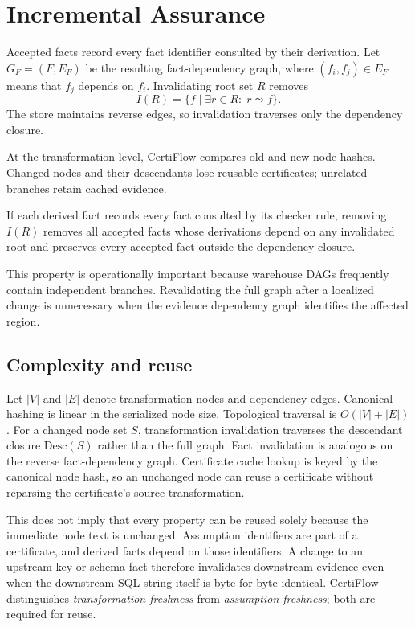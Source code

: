 \section{Incremental Assurance}

Accepted facts record every fact identifier consulted by their derivation. Let $G_F=(F,E_F)$ be the resulting fact-dependency graph, where $(f_i,f_j)\in E_F$ means that $f_j$ depends on $f_i$. Invalidating root set $R$ removes
\[
  I(R)=\{f\mid \exists r\in R:\;r\leadsto f\}.
\]
The store maintains reverse edges, so invalidation traverses only the dependency closure.

At the transformation level, CertiFlow compares old and new node hashes. Changed nodes and their descendants lose reusable certificates; unrelated branches retain cached evidence.

\begin{proposition}
If each derived fact records every fact consulted by its checker rule, removing $I(R)$ removes all accepted facts whose derivations depend on any invalidated root and preserves every accepted fact outside the dependency closure.
\end{proposition}

This property is operationally important because warehouse DAGs frequently contain independent branches. Revalidating the full graph after a localized change is unnecessary when the evidence dependency graph identifies the affected region.

\subsection{Complexity and reuse}

Let $|V|$ and $|E|$ denote transformation nodes and dependency edges. Canonical hashing is linear in the serialized node size. Topological traversal is $O(|V|+|E|)$. For a changed node set $S$, transformation invalidation traverses the descendant closure $\mathrm{Desc}(S)$ rather than the full graph. Fact invalidation is analogous on the reverse fact-dependency graph. Certificate cache lookup is keyed by the canonical node hash, so an unchanged node can reuse a certificate without reparsing the certificate's source transformation.

This does not imply that every property can be reused solely because the immediate node text is unchanged. Assumption identifiers are part of a certificate, and derived facts depend on those identifiers. A change to an upstream key or schema fact therefore invalidates downstream evidence even when the downstream SQL string itself is byte-for-byte identical. CertiFlow distinguishes \emph{transformation freshness} from \emph{assumption freshness}; both are required for reuse.
